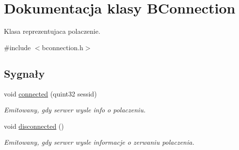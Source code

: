 \hypertarget{class_b_connection}{
\section{Dokumentacja klasy BConnection}
\label{class_b_connection}
}


Klasa reprezentujaca polaczenie.  


{\ttfamily \#include $<$bconnection.h$>$}\subsection*{Sygnały}
\begin{DoxyCompactItemize}
\item 
void \hyperlink{class_b_connection_a90dca3f0343427e31bb4544a8accf56d}{connected} (quint32 sessid)
\begin{DoxyCompactList}\small\item\em Emitowany, gdy serwer wysle info o polaczeniu. \item\end{DoxyCompactList}\item 
\hypertarget{class_b_connection_a20fa85863f4cb396d3141e01d4928fd4}{
void \hyperlink{class_b_connection_a20fa85863f4cb396d3141e01d4928fd4}{disconnected} ()}
\label{class_b_connection_a20fa85863f4cb396d3141e01d4928fd4}

\begin{DoxyCompactList}\small\item\em Emitowany, gdy serwer wysle informacje o zerwaniu polaczenia. \item\end{DoxyCompactList}\end{DoxyCompactItemize}
